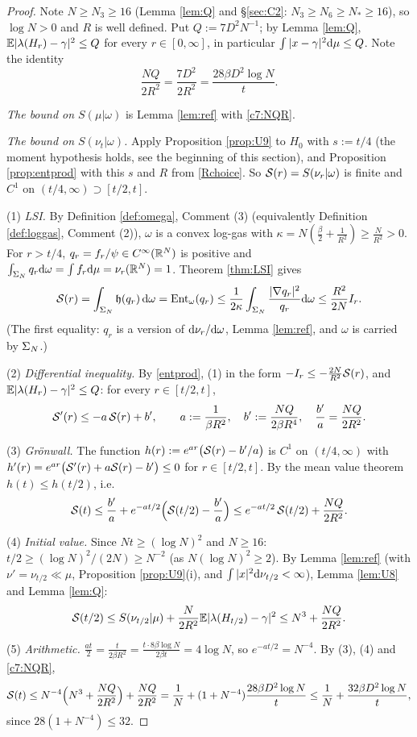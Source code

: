 \begin{proof}
Note $N\ge N_3\ge16$ (Lemma \ref{lem:Q} and \S\ref{sec:C2}: $N_3\ge N_6\ge N_*\ge16$), so $\log N>0$ and $R$ is well defined. Put $Q:=7D^2N^{-1}$; by Lemma \ref{lem:Q}, $\mathbb{E}|\lambda(H_r)-\gamma|^2\le Q$ for every $r\in[0,\infty]$, in particular $\int|x-\gamma|^2\mathrm{d}\mu\le Q$.
Note the identity
\begin{equation}\label{c7:NQR}
\frac{NQ}{2R^2}=\frac{7D^2}{2R^2}=\frac{28\beta D^2\log N}{t}.
\end{equation}

\emph{The bound on $S(\mu|\omega)$} is Lemma \ref{lem:ref} with \eqref{c7:NQR}.

\emph{The bound on $S(\nu_t|\omega)$.} Apply Proposition \ref{prop:U9} to $H_0$ with $s:=t/4$ (the moment hypothesis holds, see the beginning of this section), and Proposition \ref{prop:entprod} with this $s$ and $R$ from \eqref{Rchoice}. So $\mathcal{S}(r)=S(\nu_r|\omega)$ is finite and $C^1$ on $(t/4,\infty)\supset[t/2,t]$.

(1) \emph{LSI.} By Definition \ref{def:omega}, Comment (3) (equivalently Definition \ref{def:loggas}, Comment (2)), $\omega$ is a convex log-gas with $\kappa=N(\frac\beta2+\frac1{R^2})\ge\frac N{R^2}>0$. For $r>t/4$, $q_r=f_r/\psi\in C^\infty(\mathbb{R}^N)$ is positive and $\int_{\Sigma_N}q_r\mathrm{d}\omega=\int f_r\mathrm{d}\mu=\nu_r(\mathbb{R}^N)=1$. Theorem \ref{thm:LSI} gives
\[
\mathcal{S}(r)=\int_{\Sigma_N}\mathfrak h(q_r)\,\mathrm{d}\omega=\operatorname{Ent}_\omega(q_r)\le\frac1{2\kappa}\int_{\Sigma_N}\frac{|\nabla q_r|^2}{q_r}\mathrm{d}\omega\le\frac{R^2}{2N}I_r .
\]
(The first equality: $q_r$ is a version of $\mathrm{d}\nu_r/\mathrm{d}\omega$, Lemma \ref{lem:ref}, and $\omega$ is carried by $\Sigma_N$.)

(2) \emph{Differential inequality.} By \eqref{entprod}, (1) in the form $-I_r\le-\frac{2N}{R^2}\mathcal{S}(r)$, and $\mathbb{E}|\lambda(H_r)-\gamma|^2\le Q$: for every $r\in[t/2,t]$,
\[
\mathcal{S}'(r)\le-a\,\mathcal{S}(r)+b',\qquad a:=\frac1{\beta R^2},\quad b':=\frac{NQ}{2\beta R^4},\quad \frac{b'}a=\frac{NQ}{2R^2}.
\]

(3) \emph{Gr\"onwall.} The function $h(r):=e^{ar}\big(\mathcal{S}(r)-b'/a\big)$ is $C^1$ on $(t/4,\infty)$ with $h'(r)=e^{ar}\big(\mathcal{S}'(r)+a\mathcal{S}(r)-b'\big)\le0$ for $r\in[t/2,t]$. By the mean value theorem $h(t)\le h(t/2)$, i.e.
\[
\mathcal{S}(t)\le\frac{b'}a+e^{-at/2}\Big(\mathcal{S}(t/2)-\frac{b'}a\Big)\le e^{-at/2}\,\mathcal{S}(t/2)+\frac{NQ}{2R^2}.
\]

(4) \emph{Initial value.} Since $Nt\ge(\log N)^2$ and $N\ge16$: $t/2\ge(\log N)^2/(2N)\ge N^{-2}$ (as $N(\log N)^2\ge2$). By Lemma \ref{lem:ref} (with $\nu'=\nu_{t/2}\ll\mu$, Proposition \ref{prop:U9}(i), and $\int|x|^2\mathrm{d}\nu_{t/2}<\infty$), Lemma \ref{lem:U8} and Lemma \ref{lem:Q}:
\[
\mathcal{S}(t/2)\le S(\nu_{t/2}|\mu)+\frac N{2R^2}\mathbb{E}|\lambda(H_{t/2})-\gamma|^2\le N^3+\frac{NQ}{2R^2}.
\]

(5) \emph{Arithmetic.} $\frac{at}2=\frac{t}{2\beta R^2}=\frac{t\cdot8\beta\log N}{2\beta t}=4\log N$, so $e^{-at/2}=N^{-4}$. By (3), (4) and \eqref{c7:NQR},
\[
\mathcal{S}(t)\le N^{-4}\Big(N^3+\frac{NQ}{2R^2}\Big)+\frac{NQ}{2R^2}=\frac1N+(1+N^{-4})\frac{28\beta D^2\log N}{t}\le\frac1N+\frac{32\beta D^2\log N}{t},
\]
since $28(1+N^{-4})\le32$.
\end{proof}

